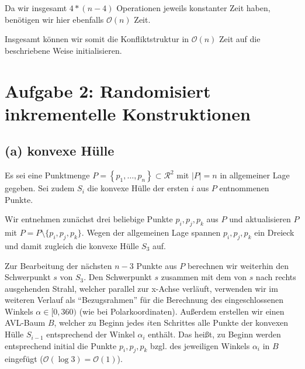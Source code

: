 \documentclass[a4paper]{article}
\begin{document}
Da wir insgesamt $4 * (n-4)$ Operationen jeweils konstanter Zeit haben, benötigen
wir hier ebenfalls $\mathcal{O}(n)$ Zeit.

Insgesamt können wir somit die Konfliktstruktur in $\mathcal{O}(n)$ Zeit auf die beschriebene Weise initialisieren.









\section*{Aufgabe 2: Randomisiert inkrementelle Konstruktionen}



\subsection*{(a) konvexe Hülle}

Es sei eine Punktmenge $P = \left\{p_1, \dots, p_n\right\} \subset \mathcal{R}^2$ mit $|P| = n$ in allgemeiner Lage gegeben. Sei zudem $S_i$ die konvexe Hülle der ersten $i$ aus $P$
entnommenen Punkte.

Wir entnehmen zunächst drei beliebige Punkte $p_i, p_j, p_k$ aus $P$ und aktualisieren
$P$ mit $P = P \setminus \{p_i, p_j, p_k\}$. Wegen der allgemeinen Lage  spannen $p_i, p_j, p_k$
ein Dreieck und damit zugleich die konvexe Hülle $S_3$ auf. 

Zur Bearbeitung der nächsten
$n-3$ Punkte aus $P$ berechnen wir weiterhin den Schwerpunkt $s$ von $S_3$.
Den Schwerpunkt $s$ zusammen mit dem von $s$ nach rechts ausgehenden Strahl, welcher parallel zur x-Achse verläuft,
verwenden wir im weiteren Verlauf als "`Bezugsrahmen"' für die Berechnung des eingeschlossenen Winkels $\alpha \in [0,360)$ (wie bei Polarkoordinaten).
Außerdem erstellen wir einen AVL-Baum $B$, welcher zu Beginn jedes $i$ten Schrittes alle Punkte der konvexen Hülle $S_{i-1}$ entsprechend
der Winkel $\alpha_i$ enthält. Das heißt, zu Beginn werden entsprechend initial die Punkte $p_i, p_j, p_k$ bzgl. des jeweiligen Winkels $\alpha_i$ 
in $B$ eingefügt ($\mathcal{O}(\log 3) = \mathcal{O}(1)$).

\begin{figure}[!htb]
\centering
{} 
\end{figure} 
\end{document}
